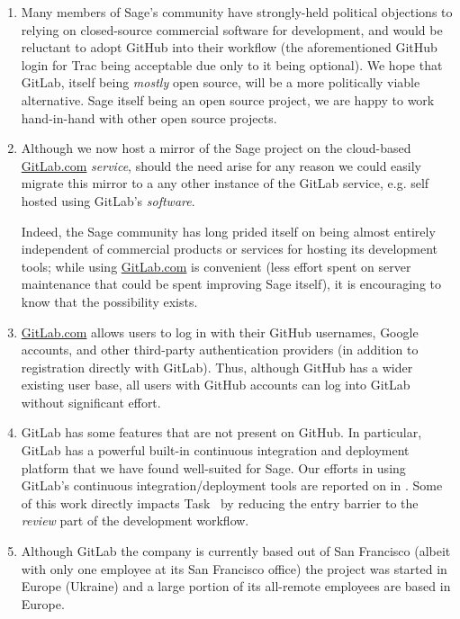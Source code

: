 \begin{enumerate}
\item Many members of Sage's community have strongly-held political objections
    to relying on closed-source commercial software for development, and would
    be reluctant to adopt GitHub into their workflow (the aforementioned GitHub
    login for Trac being acceptable due only to it being optional).  We hope
    that GitLab, itself being {\em mostly} open source, will be a more
    politically viable alternative. Sage itself being an open source project,
    we are happy to work hand-in-hand with other open source projects.

  \item Although we now host a mirror of the Sage project on
    the cloud-based \url{GitLab.com} {\em service}, should the need
    arise for any reason we could easily migrate this mirror to a
    any other instance of the GitLab service, e.g. self hosted using
    GitLab's {\em software}.

    Indeed, the Sage community has long prided itself on being almost entirely
    independent of commercial products or services for hosting its
    development tools; while using \url{GitLab.com} is convenient (less
    effort spent on server maintenance that could be spent improving Sage
    itself), it is encouraging to know that the possibility exists.

\item \url{GitLab.com} allows users to log in with their GitHub usernames, Google
    accounts, and other third-party authentication providers (in addition to
    registration directly with GitLab).  Thus, although GitHub has a wider
    existing user base, all users with GitHub accounts can log into GitLab
    without significant effort.

\item GitLab has some features that are not present on GitHub.  In particular,
    GitLab has a powerful built-in continuous integration and deployment
    platform that we have found well-suited for Sage.  Our efforts in using
    GitLab's continuous integration/deployment tools are reported on in
    .  Some of
    this work directly impacts
    Task~ by reducing the entry
    barrier to the {\em review} part of the development workflow.

\item Although GitLab the company is currently based out of San Francisco
    (albeit with only one employee at its San Francisco office) the project
    was started in Europe (Ukraine) and a large portion of its all-remote
    employees are based in Europe.
\end{enumerate}

